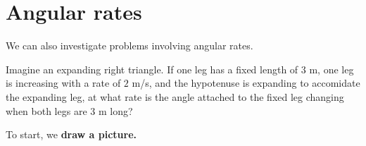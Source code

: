 \documentclass{ximera}
\begin{document}
\section{Angular rates}


We can also investigate problems involving angular rates.

\begin{example}
  Imagine an expanding right triangle. If one leg has a fixed length
  of $3$ m, one leg is increasing with a rate of $2$ m/s, and the
  hypotenuse is expanding to accomidate the expanding leg, at what
  rate is the angle attached to the fixed leg changing when both legs
  are $3$ m long?
  \begin{explanation}
    To start, we \textbf{draw a picture.}
    \begin{image}
    \end{image} 


\end{explanation}
\end{example}
\end{document}
